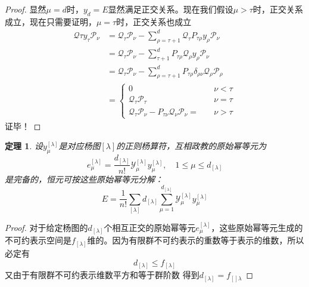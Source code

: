\documentclass[12pt]{article}
\newtheorem{theorem}{定理}[subsection]
\newtheorem{proof}{证明}[subsection]
\begin{document}
\begin{proof}
    显然$\mu=d$时，$y_d=E$显然满足正交关系。现在我们假设$\mu>\tau$时，正交关系成立，现在只需要证明，$\mu=\tau$时，正交关系也成立
    \begin{equation*}
        \begin{split}
            \mathcal{Q}\tau y_\tau\mathcal{P}_\nu&=\mathcal{Q}_\tau\mathcal{P}_\nu-\sum_{\rho=\tau+1}^{d}\mathcal{Q}_\tau P_{\tau\rho}y_\rho\mathcal{P}_\nu\\
            &=\mathcal{Q}_\tau\mathcal{P}_\nu-\sum_{\tau+1}^d P_{\tau\rho}\mathcal{Q}_\rho y_\rho \mathcal{P}_\nu\\
            &=\mathcal{Q}_\tau\mathcal{P}_\nu-\sum_{\rho=\tau+1}^d P_{\tau\rho}\delta_{\rho\nu}\mathcal{Q}_\rho\mathcal{P}_\rho\\
            &=\begin{cases}
                0\quad&\nu<\tau\\
                \mathcal{Q}_\tau\mathcal{P}_\tau\quad&\nu=\tau\\
                \mathcal{Q}_\tau\mathcal{P}_\nu-P_{\tau\nu}\mathcal{Q}_\nu\mathcal{P}_\nu=\quad&\nu>\tau
            \end{cases}
        \end{split}
    \end{equation*}
    证毕！
\end{proof}
\begin{theorem}
    设$y_\mu^{[\lambda]}$是对应杨图$[\lambda]$的正则杨算符，互相政教的原始幂等元为
    \begin{equation*}
        e_\mu^{[\lambda]}=\frac{d_{[\lambda]}}{n!}\mathcal{Y}_\mu^{[\lambda]}y_\mu^{[\lambda]},\quad1\leq\mu\leq d_[\lambda]
    \end{equation*}
    是完备的，恒元可按这些原始幂等元分解：
    \begin{equation*}
        E=\frac{1}{n!}\sum_{[\lambda]}d_{[\lambda]}\sum_{\mu=1}^{d_{[\lambda]}}\mathcal{Y}_\mu^{[\lambda]}y_\mu^{[\lambda]}
    \end{equation*}
\end{theorem}
\begin{proof}
    对于给定杨图的$d_{[\lambda]}$个相互正交的原始幂等元$e_{\mu}^{[\lambda]}$，这些原始幂等元生成的不可约表示空间是$f_{[\lambda]}$维的。因为有限群不可约表示的重数等于表示的维数，所以必定有
    \begin{equation*}
        d_{[\lambda]}\leq f_{[\lambda]}
    \end{equation*}
    又由于有限群不可约表示维数平方和等于群阶数
    得到$d_{[\lambda]}=f_{[]\lambda}$
\end{proof}
\end{document}
